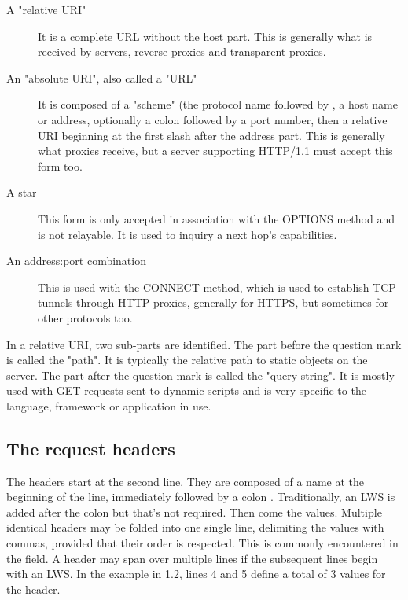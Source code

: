 \begin{description}
\item[A "relative URI"]
    It is a complete URL without the host part. This is generally what is
    received by servers, reverse proxies and transparent proxies.
    

\item[An "absolute URI", also called a "URL"]
    It is composed of a "scheme" (the protocol name followed by \chr{://}, a host
    name or address, optionally a colon \chr{:} followed by a port number, then
    a relative URI beginning at the first slash \chr{/} after the address part.
    This is generally what proxies receive, but a server supporting HTTP/1.1
    must accept this form too.
    

\item[A star \chr{*}]
    This form is only accepted in association with the OPTIONS
    method and is not relayable. It is used to inquiry a next hop's
    capabilities.

\item[An address:port combination]
    This is used with the CONNECT method, which is used to establish TCP
    tunnels through HTTP proxies, generally for HTTPS, but sometimes for
    other protocols too.
    
\end{description}

In a relative URI, two sub-parts are identified. The part before the question
mark is called the "path". It is typically the relative path to static objects
on the server. The part after the question mark is called the "query string".
It is mostly used with GET requests sent to dynamic scripts and is very
specific to the language, framework or application in use.

\subsection{The request headers}
\label{subsec:request_headers}

The headers start at the second line. They are composed of a name at the
beginning of the line, immediately followed by a colon \chr{:}. Traditionally,
an LWS is added after the colon but that's not required. Then come the values.
Multiple identical headers may be folded into one single line, delimiting the
values with commas, provided that their order is respected. This is commonly
encountered in the  field. A header may span over multiple lines if
the subsequent lines begin with an LWS. In the example in 1.2, lines 4 and 5
define a total of 3 values for the  header.

